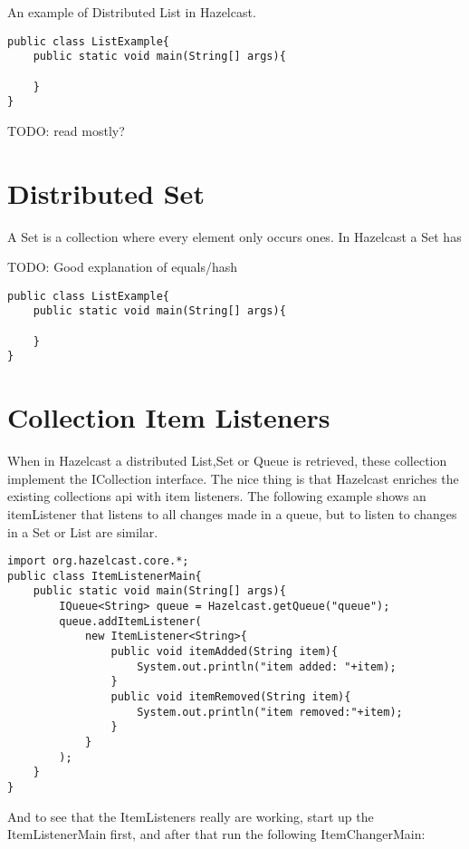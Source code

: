 An example of Distributed List in Hazelcast.

\begin{verbatim}
public class ListExample{
    public static void main(String[] args){
	
    }
}
\end{verbatim}

TODO: read mostly?

\section{Distributed Set}

A Set is a collection where every element only occurs ones. In Hazelcast a Set has 

TODO: Good explanation of equals/hash

\begin{verbatim}
public class ListExample{
    public static void main(String[] args){
	
    }
}
\end{verbatim}


\section{Collection Item Listeners}

When in Hazelcast a distributed List,Set or Queue is retrieved, these collection implement
the ICollection interface. The nice thing is that Hazelcast enriches the existing collections api
with item listeners. The following example shows an itemListener that listens to all changes made
in a queue, but to listen to changes in a Set or List are similar.

\begin{verbatim}
import org.hazelcast.core.*;	
public class ItemListenerMain{
    public static void main(String[] args){
        IQueue<String> queue = Hazelcast.getQueue("queue");
        queue.addItemListener(
            new ItemListener<String>{
                public void itemAdded(String item){
                    System.out.println("item added: "+item);
                }
                public void itemRemoved(String item){ 
                    System.out.println("item removed:"+item);
                }
            }
        );
    }
}
\end{verbatim}

And to see that the ItemListeners really are working, start up the ItemListenerMain
first, and after that run the following ItemChangerMain:

